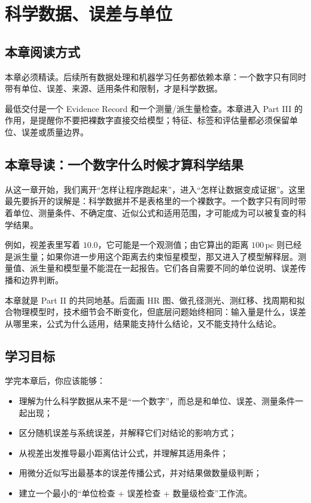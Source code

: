 \chapter{科学数据、误差与单位}

\section{本章阅读方式}

本章必须精读。后续所有数据处理和机器学习任务都依赖本章：一个数字只有同时带有单位、误差、来源、适用条件和限制，才是科学数据。

最低交付是一个 Evidence Record 和一个测量/派生量检查。本章进入 Part III 的作用，是提醒你不要把裸数字直接交给模型；特征、标签和评估量都必须保留单位、误差或质量边界。

\section{本章导读：一个数字什么时候才算科学结果}

从这一章开始，我们离开“怎样让程序跑起来”，进入“怎样让数据变成证据”。这里最先要拆开的误解是：科学数据并不是表格里的一个裸数字。一个数字只有同时带着单位、测量条件、不确定度、近似公式和适用范围，才可能成为可以被复查的科学结果。

例如，视差表里写着 \(10.0\)，它可能是一个观测值；由它算出的距离 \(100\,\mathrm{pc}\) 则已经是派生量；如果你进一步用这个距离去约束恒星模型，那又进入了模型解释层。测量值、派生量和模型量不能混在一起报告。它们各自需要不同的单位说明、误差传播和边界判断。

本章就是 Part II 的共同地基。后面画 HR 图、做孔径测光、测红移、找周期和拟合物理模型时，技术细节会不断变化，但底层问题始终相同：输入量是什么，误差从哪里来，公式为什么适用，结果能支持什么结论，又不能支持什么结论。

\section{学习目标}

学完本章后，你应该能够：

\begin{itemize}
    \item 理解为什么科学数据从来不是“一个数字”，而总是和单位、误差、测量条件一起出现；
    \item 区分随机误差与系统误差，并解释它们对结论的影响方式；
    \item 从视差出发推导最小距离估计公式，并理解其适用条件；
    \item 用微分近似写出最基本的误差传播公式，并对结果做数量级判断；
    \item 建立一个最小的“单位检查 + 误差检查 + 数量级检查”工作流。
\end{itemize}

